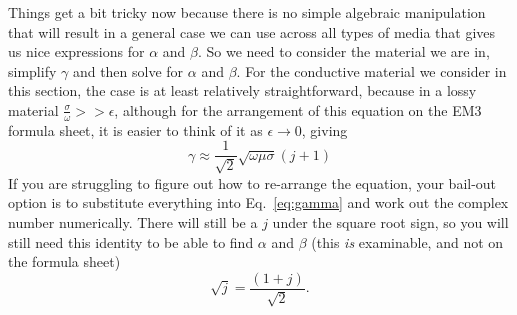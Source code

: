 \documentclass{tufte-handout}
\begin{document}
Things get a bit tricky now because there is no simple algebraic manipulation that will result in a general case we can use across all types of media that gives us nice expressions for $\alpha$ and $\beta$. So we need to consider the material we are in, simplify $\gamma$ and then solve for $\alpha$ and $\beta$. For the conductive material we consider in this section, the case is at least relatively straightforward, because in a lossy material $\frac{\sigma}{\omega} >> \epsilon$, although for the arrangement of this equation on the EM3 formula sheet, it is easier to think of it as $\epsilon \to 0$, giving
\begin{equation}
\gamma \approx \frac{1}{\sqrt{2}}\sqrt{\omega\mu\sigma}(j+1)\label{eq:gammaconductive}
\end{equation}
If you are struggling to figure out how to re-arrange the equation, your bail-out option is to substitute everything into Eq.~\ref{eq:gamma} and work out the complex number numerically. There will still be a $j$ under the square root sign, so you will still need this identity to be able to find $\alpha$ and $\beta$ (this \emph{is} examinable, and not on the formula sheet)
\begin{equation} 
\sqrt{j}=\frac{(1+j)}{\sqrt{2}}.
\end{equation}
\end{document}
